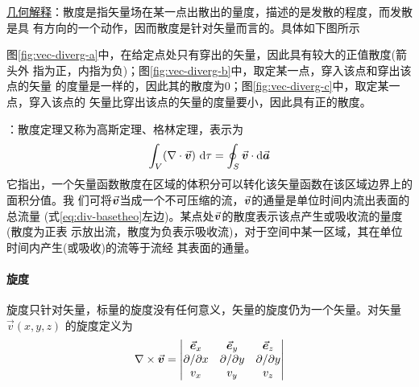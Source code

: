 \uline{几何解释}：散度是指矢量场在某一点出散出的量度，描述的是发散的程度，而发散是具
有方向的一个动作，因而散度是针对矢量而言的。具体如下图所示
\begin{figure}[ht]
    \centering
    \setlength{\abovecaptionskip}{0.2cm}
    \subfloat[]{
        
        \label{fig:vec-diverg-a}
    }
    \hfill
    \subfloat[]{
        
        \label{fig:vec-diverg-b}
    }
    \hfill
    \subfloat[]{
        
        \label{fig:vec-diverg-c}
    }
    \caption{}
    \label{fig:vec-diverg}
\end{figure}
\newline
图\ref{fig:vec-diverg-a}中，在给定点处只有穿出的矢量，因此具有较大的正值散度(箭头外
指为正，内指为负)；图\ref{fig:vec-diverg-b}中，取定某一点，穿入该点和穿出该点的矢量
的度量是一样的，因此其的散度为0；图\ref{fig:vec-diverg-c}中，取定某一点，穿入该点的
矢量比穿出该点的矢量的度量要小，因此具有正的散度。

：散度定理又称为高斯定理、格林定理，表示为
\begin{equation}
    \int_{V} (\nabla \cdot \vec{\bm{v}})\ \mathrm{d} \tau
                         = \oint_{S} \vec{\bm{v}} \cdot \mathrm{d} \vec{\bm{a}}
    \label{eq:div-basetheo}
\end{equation}
它指出，一个矢量函数散度在区域的体积分可以转化该矢量函数在该区域边界上的面积分值。我
们可将$\vec{\bm{v}}$当成一个不可压缩的流，$\vec{\bm{v}}$的通量是单位时间内流出表面的总流量
(式\eqref{eq:div-basetheo}左边)。某点处$\vec{\bm{v}}$的散度表示该点产生或吸收流的量度(散度为正表
示放出流，散度为负表示吸收流)，对于空间中某一区域，其在单位时间内产生(或吸收)的流等于流经
其表面的通量。


\paragraph*{旋度}
旋度只针对矢量，标量的旋度没有任何意义，矢量的旋度仍为一个矢量。对矢量$\vec{v}(x, y, z)$
的旋度定义为
\begin{equation}
    \nabla \times \vec{\bm{v}} = 
    \left|\begin{matrix}
        \vec{\bm{e}}_x               &   \vec{\bm{e}}_y               &   \vec{\bm{e}}_z   \\
        \partial / \partial x   &   \partial / \partial y   &   \partial / \partial y  \\
        v_x                     &   v_y                     &   v_z 
    \end{matrix}\right|
    \label{eq:vec-curl}
\end{equation}


